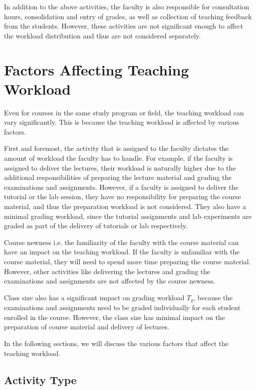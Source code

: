 In addition to the above activities, the faculty is also responsible for consultation hours, consolidation and entry of grades, as well as collection of teaching feedback from the students. However, these activities are not significant enough to affect the workload distribution and thus are not considered separately.

\section{Factors Affecting Teaching Workload}

Even for courses in the same study program or field, the teaching workload can vary significantly. This is because the teaching workload is affected by various factors.

First and foremost, the activity that is assigned to the faculty dictates the amount of workload the faculty has to handle. For example, if the faculty is assigned to deliver the lectures, their workload is naturally higher due to the additional responsibilities of preparing the lecture material and grading the examinations and assignments. However, if a faculty is assigned to deliver the tutorial or the lab session, they have no responsibility for preparing the course material, and thus the preparation workload is not considered. They also have a minimal grading workload, since the tutorial assignments and lab experiments are graded as part of the delivery of tutorials or lab respectively.

Course newness i.e. the familiarity of the faculty with the course material can have an impact on the teaching workload. If the faculty is unfamiliar with the course material, they will need to spend more time preparing the course material. However, other activities like delivering the lectures and grading the examinations and assignments are not affected by the course newness.

Class size also has a significant impact on grading workload \( T_g \), because the examinations and assignments need to be graded individually for each student enrolled in the course. However, the class size has minimal impact on the preparation of course material and delivery of lectures.

In the following sections, we will discuss the various factors that affect the teaching workload.

\subsection{Activity Type}
\label{sec:activity_type}

